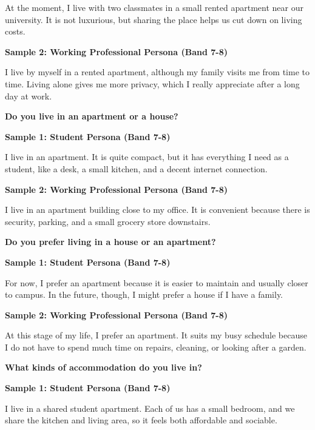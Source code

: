 At the moment, I live with two classmates in a small rented apartment near our university. It is not luxurious, but sharing the place helps us cut down on living costs.

\textbf{Sample 2: Working Professional Persona (Band 7-8)}

I live by myself in a rented apartment, although my family visits me from time to time. Living alone gives me more privacy, which I really appreciate after a long day at work.

\separator

\begin{ieltsquestion}
\textbf{Do you live in an apartment or a house?}
\end{ieltsquestion}
\textbf{Sample 1: Student Persona (Band 7-8)}

I live in an apartment. It is quite compact, but it has everything I need as a student, like a desk, a small kitchen, and a decent internet connection.

\textbf{Sample 2: Working Professional Persona (Band 7-8)}

I live in an apartment building close to my office. It is convenient because there is security, parking, and a small grocery store downstairs.

\separator

\begin{ieltsquestion}
\textbf{Do you prefer living in a house or an apartment?}
\end{ieltsquestion}
\textbf{Sample 1: Student Persona (Band 7-8)}

For now, I prefer an apartment because it is easier to maintain and usually closer to campus. In the future, though, I might prefer a house if I have a family.

\textbf{Sample 2: Working Professional Persona (Band 7-8)}

At this stage of my life, I prefer an apartment. It suits my busy schedule because I do not have to spend much time on repairs, cleaning, or looking after a garden.

\separator

\begin{ieltsquestion}
\textbf{What kinds of accommodation do you live in?}
\end{ieltsquestion}
\textbf{Sample 1: Student Persona (Band 7-8)}

I live in a shared student apartment. Each of us has a small bedroom, and we share the kitchen and living area, so it feels both affordable and sociable.

